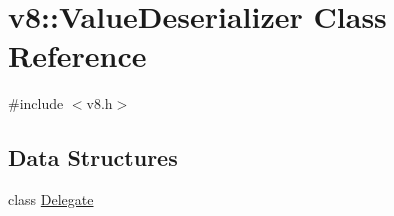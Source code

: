 \hypertarget{classv8_1_1ValueDeserializer}{}\section{v8\+:\+:Value\+Deserializer Class Reference}
\label{classv8_1_1ValueDeserializer}


{\ttfamily \#include $<$v8.\+h$>$}

\subsection*{Data Structures}
\begin{DoxyCompactItemize}
\item 
class \mbox{\hyperlink{classv8_1_1ValueDeserializer_1_1Delegate}{Delegate}}
\end{DoxyCompactItemize}
